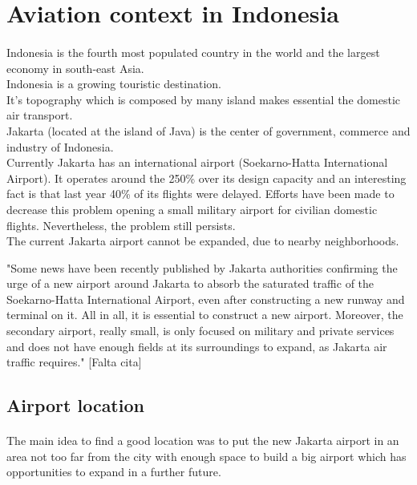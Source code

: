 \section{Aviation context in Indonesia}
\paragraph{} Indonesia is the fourth most populated country in the world and the largest economy in
south-east Asia.\\

Indonesia is a growing touristic destination.\\

It’s topography which is composed by many island makes essential the domestic air
transport.\\

Jakarta (located at the island of Java) is the center of government, commerce and industry of Indonesia.\\

Currently Jakarta has an international airport (Soekarno-Hatta International Airport). It operates around the 250\% over its design capacity and an interesting fact is that last year 40\% of its flights were delayed. Efforts have been made to decrease this problem opening a small military airport for civilian domestic flights. Nevertheless, the problem still persists. \\

The current Jakarta airport cannot be expanded, due to nearby neighborhoods.

"Some news have been recently published by Jakarta authorities confirming the urge of a new airport around Jakarta to absorb the saturated traffic of the Soekarno-Hatta International Airport, even after constructing a new runway and terminal on it. 
All in all, it is essential to construct a new airport. Moreover, the secondary airport, really small, is only focused on military and private services and does not have enough fields at its surroundings to expand, as Jakarta air traffic requires." [Falta cita]


	\subsection{Airport location}
\paragraph{}The main idea to find a good location was to put the new Jakarta airport in an area not too far from the city with enough space to build a big airport which has opportunities to expand in a further future.

